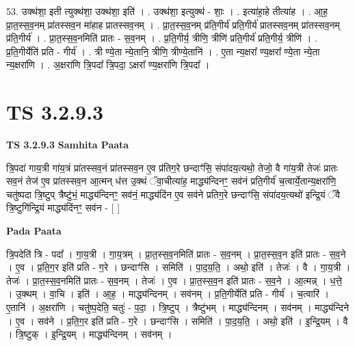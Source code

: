 \documentclass[17pt]{extarticle}
\begin{document}
53. उक्थ॑शा॒ इती त्युक्थ॑शा॒ उक्थ॑शा॒ इति॑ । . उक्थ॑शा॒ इत्युक्थ॑ - शाः॒ । . इत्या॑हा॒हे तीत्या॑ह । . आ॒ह॒ प्रा॒त॒स्स॒व॒नम् प्रा॑तस्सव॒न मा॑हाह प्रातस्सव॒नम् । . प्रा॒त॒स्स॒व॒नम् प्र॑ति॒गीर्य॑ प्रति॒गीर्य॑ प्रातस्सव॒नम् प्रा॑तस्सव॒नम् प्र॑ति॒गीर्य॑ । . प्रा॒त॒स्स॒व॒नमिति॑ प्रातः - स॒व॒नम् । . प्र॒ति॒गीर्य॒ त्रीणि॒ त्रीणि॑ प्रति॒गीर्य॑ प्रति॒गीर्य॒ त्रीणि॑ । . प्र॒ति॒गीर्येति॑ प्रति - गीर्य॑ । . त्री ण्ये॒ता न्ये॒तानि॒ त्रीणि॒ त्रीण्ये॒तानि॑ । . ए॒ता न्य॒क्षरा᳚ ण्य॒क्षरा᳚ ण्ये॒ता न्ये॒ता न्य॒क्षरा॑णि । . अ॒क्षरा॑णि त्रि॒पदा᳚ त्रि॒पदा॒ ऽक्षरा᳚ ण्य॒क्षरा॑णि त्रि॒पदा᳚ । \newline


\section{ TS 3.2.9.3 }

\textbf{TS 3.2.9.3 } \newline
\textbf{Samhita Paata} \newline

त्रि॒पदा॑ गाय॒त्री गा॑य॒त्रं प्रा॑तस्सव॒नं प्रा॑तस्सव॒न ए॒व प्र॑तिग॒रे छन्दाꣳ॑सि॒ संपा॑दय॒त्यथो॒ तेजो॒ वै गा॑य॒त्री तेजः॑ प्रातः सव॒नं तेज॑ ए॒व प्रा॑तस्सव॒न आ॒त्मन् ध॑त्त उ॒क्थं ॅवा॒चीत्या॑ह॒ माद्ध्य॑न्दिनꣳ॒॒ सव॑नं प्रति॒गीर्य॑ च॒त्वार्ये॒तान्य॒क्षरा॑णि॒ चतु॑ष्पदा त्रि॒ष्टुप् त्रैष्टु॑भं॒ माद्ध्य॑न्दिनꣳ॒॒ सव॑नं॒ माद्ध्य॑दिंन ए॒व सव॑ने प्रतिग॒रे छन्दाꣳ॑सि॒ संपा॑दय॒त्यथो॑ इन्द्रि॒यं ॅवै त्रि॒ष्टुगि॑न्द्रि॒यं माद्ध्य॑दिंनꣳ॒॒ सव॑न - [  ] \newline

\textbf{Pada Paata} \newline

त्रि॒पदेति॑ त्रि - पदा᳚ । गा॒य॒त्री । गा॒य॒त्रम् । प्रा॒त॒स्स॒व॒नमिति॑ प्रातः - स॒व॒नम् । प्रा॒त॒स्स॒व॒न इति॑ प्रातः - स॒व॒ने । ए॒व । प्र॒ति॒ग॒र इति॑ प्रति - ग॒रे । छन्दाꣳ॑सि । समिति॑ । पा॒द॒य॒ति॒ । अथो॒ इति॑ । तेजः॑ । वै । गा॒य॒त्री । तेजः॑ । प्रा॒त॒स्स॒व॒नमिति॑ प्रातः - स॒व॒नम् । तेजः॑ । ए॒व । प्रा॒त॒स्स॒व॒न इति॑ प्रातः - स॒व॒ने । आ॒त्मन्न् । ध॒त्ते॒ । उ॒क्थम् । वा॒चि । इति॑ । आ॒ह॒ । माद्ध्य॑न्दिनम् । सव॑नम् । प्र॒ति॒गीर्येति॑ प्रति - गीर्य॑ । च॒त्वारि॑ । ए॒तानि॑ । अ॒क्षरा॑णि । चतु॑ष्प॒देति॒ चतुः॑ - प॒दा॒ । त्रि॒ष्टुप् । त्रैष्टु॑भम् । माद्ध्य॑न्दिनम् । सव॑नम् । माद्ध्य॑न्दिने । ए॒व । सव॑ने । प्र॒ति॒ग॒र इति॑ प्रति - ग॒रे । छन्दाꣳ॑सि । समिति॑ । पा॒द॒य॒ति॒ । अथो॒ इति॑ । इ॒न्द्रि॒यम् । वै । त्रि॒ष्टुक् । इ॒न्द्रि॒यम् । माद्ध्य॑न्दिनम् । सव॑नम् ।  \newline
\end{document}

